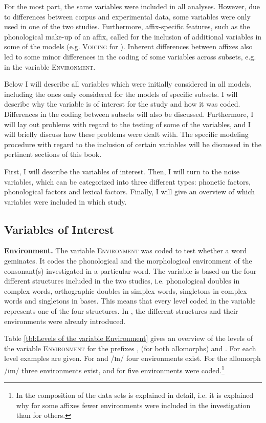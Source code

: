 For the most part, the same variables were included in all analyses. However, due to differences between corpus and experimental data, some variables were only used in one of the two studies. 
 Furthermore, affix-specific features, such as the phonological make-up of an affix, called for the inclusion of additional variables in some of the models (e.g. \textsc{Voicing} for ). Inherent differences between affixes also led to some minor differences in the coding of some variables across subsets, e.g. in the variable \textsc{Environment}. 
 
Below I will describe all variables which were initially considered in all models, including the ones only considered for the models of specific subsets. I will describe why the variable is of interest for the study and how it was coded. Differences in the coding between subsets will also be discussed. Furthermore, I will lay out  problems with regard to the testing of some of the variables, and I will briefly discuss how these problems were dealt with. The specific modeling procedure with regard to the inclusion of certain variables will be discussed in the pertinent sections of this book.


First, I will describe the variables of interest. Then, I will turn to the noise variables, which can be categorized  into three different types: phonetic factors, phonological factors and lexical factors.  Finally, I will give an overview of which variables were included in which study. 

\subsection{Variables of Interest} \label{variables of interest}

\textbf{Environment.}  The variable \textsc{Environment} was coded to test whether a word geminates. It codes the phonological and the morphological environment of the consonant(s) investigated in a particular word. The variable is based on the four different structures included in the two studies,  i.e. phonological doubles in complex words, orthographic doubles in simplex words, singletons in complex words and singletons in bases. This means that every level coded in the variable represents one of the four structures. In , the different structures and their environments were already introduced. %
 
 Table \ref{tbl:Levels of the variable Environment} gives an overview of the levels of the variable \textsc{Environment} for the prefixes ,  (for both allomorphs) and . For each level examples are given.
 For  and /ɪn/ four environments exist. For the allomorph /ɪm/ three environments exist, and for  five environments were coded.\footnote{In  the composition of the data sets is explained in detail, i.e. it is explained why for some affixes fewer environments were included in the investigation than for others.}
 

